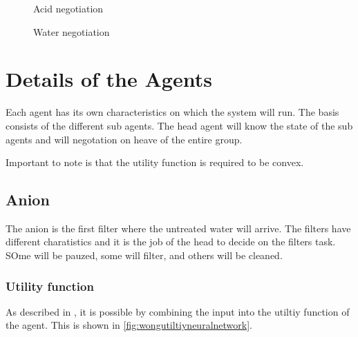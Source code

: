 \begin{figure}
	\centering
	\caption{Acid negotiation}
	\label{fig:agent-plant-acid}
\end{figure}

\begin{figure}
	\centering
	\caption{Water negotiation}
	\label{fig:agent-plant-water}
\end{figure}


\section{Details of the Agents}
Each agent has its own characteristics on which the system will run. The basis consists of the different sub agents. The head agent will know the state of the sub agents and will negotation on heave of the entire group. 

Important to note is that the utility function is required to be convex. 
\subsection{Anion}
The anion is the first filter where the untreated water will arrive. The filters have different charatistics and it is the job of the head to decide on the filters task. SOme will be pauzed, some will filter, and others will be cleaned. 
\subsubsection{Utility function}
As described in \citet{wong2010multi}, it is possible by combining the input into the utiltiy function of the agent. This is shown in \cref{fig:wongutiltiyneuralnetwork}. 

